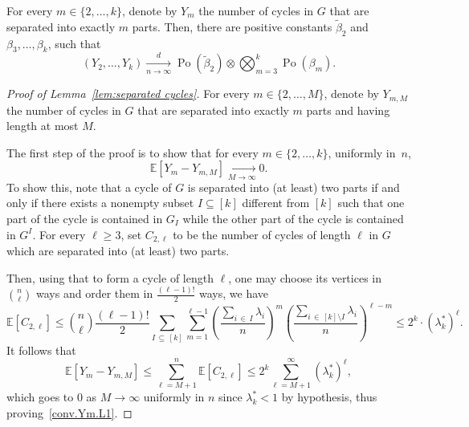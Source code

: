 \documentclass[AHL,Unicode,longabstracts,published]{cedram}
\newcommand{\bbE}{\mathbb{E}}
\DeclareMathOperator{\rPo}{Po}
\begin{document}
\begin{lemm}\label{lem:separated cycles}
For every $m\in \{2,\dots,k\}$, denote by $Y_m$ the number of cycles in $G$ that are separated into exactly $m$ parts. Then, there are positive constants $\widetilde \beta_2$ and $\beta_3, \ldots, \beta_k$, such that
\[
(Y_2, \ldots, Y_k)\xrightarrow[n\to \infty]{d} \rPo(\widetilde \beta_2)\otimes \bigotimes_{m=3}^k \rPo(\beta_m).
\]
\end{lemm}
\begin{proof}[Proof of Lemma~\ref{lem:separated cycles}]
For every $m\in \{2,\ldots, M\}$, denote by $Y_{m,M}$ the number of cycles in $G$ that are separated into exactly $m$ parts and having length at most $M$.


The first step of the proof is to show that for every $m\in \{2,\dots,k\}$, uniformly in~$n$,
\begin{equation}\label{conv.Ym.L1}
\bbE[Y_m-Y_{m,M}] \xrightarrow[M\to \infty]{} 0.
\end{equation}
To show this, note that a cycle of $G$ is separated into (at least) two parts if and only if there exists a nonempty subset $I\subseteq [k]$ different from $[k]$ such that one part of the cycle is contained in $G_I$ while the other part of the cycle is contained in $G^I$. For every $\ell \ge 3$, set $C_{2,\ell}$ to be the number of cycles of length $\ell$ in $G$ which are separated into (at least) two parts.


Then, using that to form a cycle of length $\ell$, one may choose its vertices in $\binom{n}{\ell}$ ways and order them in $\frac{(\ell-1)!}{2}$ ways, we have
\begin{equation}\label{eq:lem cycles}
\bbE [C_{2,\ell}] \le \binom{n}{\ell} \frac{(\ell-1)!}{2} \sum_{I\,\subseteq\,[k]} \sum_{m=1}^{\ell-1} \left(\frac{\sum_{i\,\in\,I} \lambda_i}{n}\right)^m \left(\frac{\sum_{i\,\in\,[k]\setminus I} \lambda_i}{n}\right)^{\ell-m}\le 2^k\cdot (\lambda_k^*)^\ell.
\end{equation}
It follows that
\begin{equation*}
\bbE\left[Y_m - Y_{m,M}\right] \le \sum_{\ell= M+1}^n \bbE [C_{2,\ell}]\le 2^k \sum_{\ell=M+1}^\infty (\lambda_k^*)^{\ell},
\end{equation*}
which goes to $0$ as $M\to \infty$ uniformly in $n$ since $\lambda_k^*<1$ by hypothesis, thus proving~\eqref{conv.Ym.L1}.


\end{proof}
\end{document}
